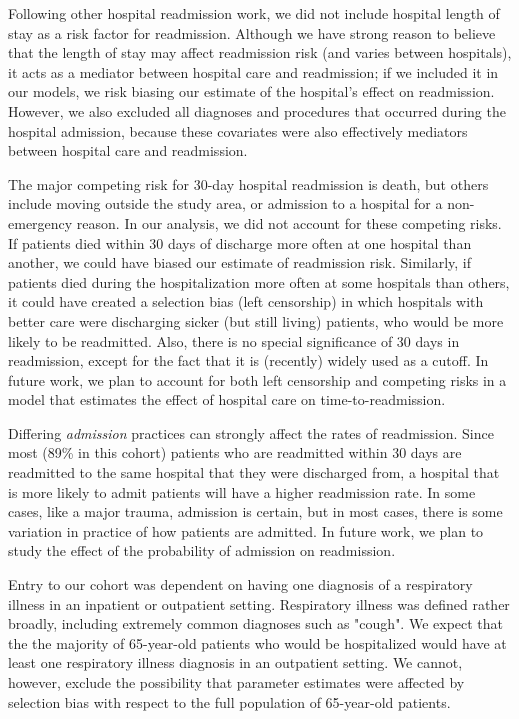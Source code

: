 \documentclass[]{article}\usepackage[]{graphicx}\usepackage[]{color}
\begin{document}
Following other hospital readmission work, we did not include hospital length of stay as a risk factor for readmission. Although we have strong reason to believe that the length of stay may affect readmission risk (and varies between hospitals), it acts as a mediator between hospital care and readmission; if we included it in our models, we risk biasing our estimate of the hospital's effect on readmission. However, we also excluded all diagnoses and procedures that occurred during the hospital admission, because these covariates were also effectively mediators between hospital care and readmission.

The major competing risk for 30-day hospital readmission is death, but others include moving outside the study area, or admission to a hospital for a non-emergency reason. In our analysis, we did not account for these competing risks. If patients died within 30 days of discharge more often at one hospital than another, we could have biased our estimate of readmission risk. Similarly, if patients died during the hospitalization more often at some hospitals than others, it could have created a selection bias (left censorship) in which hospitals with better care were discharging sicker (but still living) patients, who would be more likely to be readmitted. Also, there is no special significance of 30 days in readmission, except for the fact that it is (recently) widely used as a cutoff. In future work, we plan to account for both left censorship and competing risks in a model that estimates the effect of hospital care on time-to-readmission.

Differing \emph{admission} practices can strongly affect the rates of readmission.\supercite{epstein_relationship_2011} Since most  (89\% in this cohort) patients who are readmitted within 30 days are readmitted to the same hospital that they were discharged from, a hospital that is more likely to admit patients will have a higher readmission rate. In some cases, like a major trauma, admission is certain, but in most cases, there is some variation in practice of how patients are admitted. In future work, we plan to study the effect of the probability of admission on readmission.

Entry to our cohort was dependent on having one diagnosis of a respiratory illness in an inpatient or outpatient setting. Respiratory illness was defined rather broadly, including extremely common diagnoses such as "cough". We expect that the the majority of 65-year-old patients who would be hospitalized would have at least one respiratory illness diagnosis in an outpatient setting. We cannot, however, exclude the possibility that parameter estimates were affected by selection bias with respect to the full population of 65-year-old patients.
\end{document}
